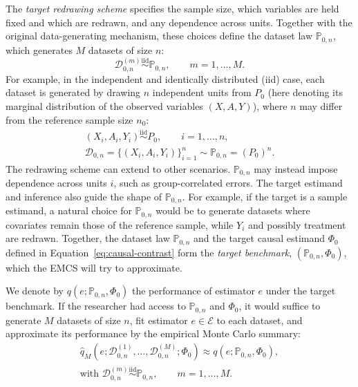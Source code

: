 The \emph{target redrawing scheme} specifies the sample size, which variables are held fixed and which are redrawn, and any dependence across units. Together with the original data-generating mechanism, these choices define the dataset law \(\mathbb P_{0,n}\), which generates \(M\) datasets of size \(n\):
\begin{equation}
\mathcal D_{0,n}^{(m)}
\overset{\mathrm{iid}}{\sim}\mathbb P_{0,n},
\qquad m=1,\dots,M.
\label{eq:target-dataset-draws}
\end{equation}
For example, in the independent and identically distributed (iid) case, each dataset is generated by drawing \(n\) independent units from \(P_0\) (here denoting its marginal distribution of the observed variables \((X,A,Y)\)), where \(n\) may differ from the reference sample size \(n_0\):
\[
\begin{gathered}
(X_i,A_i,Y_i)\overset{\mathrm{iid}}{\sim}P_0,
\qquad i=1,\dots,n,\\
\mathcal D_{0,n}=\{(X_i,A_i,Y_i)\}_{i=1}^n
\sim\mathbb P_{0,n}=(P_0)^n.
\end{gathered}
\]
The redrawing scheme can extend to other scenarios. \(\mathbb P_{0,n}\) may instead impose dependence across units $i$, such as group-correlated errors. The target estimand and inference also guide the shape of \(\mathbb P_{0,n}\). For example, if the target is a sample estimand, a natural choice for \(\mathbb P_{0,n}\) would be to generate datasets where covariates remain those of the reference sample, while \(Y_i\) and possibly treatment are redrawn. Together, the dataset law \(\mathbb P_{0,n}\) and the target causal estimand \(\Phi_0\) defined in Equation~\eqref{eq:causal-contrast} form the \emph{target benchmark}, \((\mathbb P_{0,n},\Phi_0)\), which the EMCS will try to approximate.

We denote by \(q(e;\mathbb P_{0,n},\Phi_0)\) the performance of estimator \(e\) under the target benchmark. If the researcher had access to \(\mathbb P_{0,n}\) and \(\Phi_0\), it would suffice to generate \(M\) datasets of size \(n\),
fit estimator \(e\in\mathcal E\) to each dataset, and approximate its performance by the empirical Monte Carlo summary:
\begin{equation}
\begin{gathered}
\widehat q_M
\left(
e;
\mathcal D_{0,n}^{(1)},\dots,\mathcal D_{0,n}^{(M)};
\Phi_0
\right)
\approx q(e;\mathbb P_{0,n},\Phi_0),\\
\text{with }\mathcal D_{0,n}^{(m)}
\overset{\mathrm{iid}}{\sim}\mathbb P_{0,n},
\qquad m=1,\dots,M.
\end{gathered}
\label{eq:target-monte-carlo-performance}
\end{equation}


